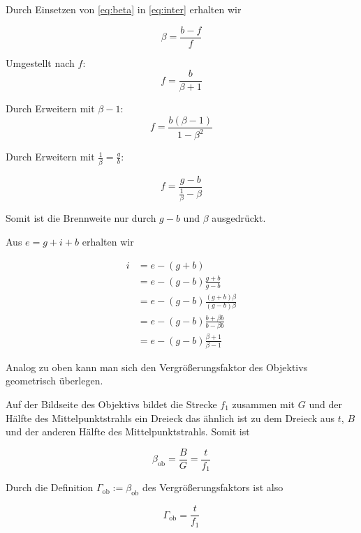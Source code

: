\documentclass[a4paper,german,12pt,smallheadings]{scrartcl}
\begin{document}
Durch Einsetzen von \ref{eq:beta} in \ref{eq:inter} erhalten wir

\begin{equation}
  \beta = \frac{b-f}{f}
\end{equation}

Umgestellt nach $f$:
\begin{equation}
  f = \frac{b}{\beta + 1}
\end{equation}

Durch Erweitern mit $\beta - 1$:
\begin{equation}
  f = \frac{b(\beta - 1)}{1-\beta^2}
\end{equation}

Durch Erweitern mit $\frac{1}{\beta} = \frac{g}{b}$:

\begin{equation}
  f = \frac{g - b}{\frac{1}{\beta} - \beta}
\end{equation}

Somit ist die Brennweite nur durch $g-b$ und $\beta$ ausgedrückt.

Aus $e = g + i + b$ erhalten wir

\begin{align*}
  i &= e - (g+b) \\
    &= e - (g-b) \frac{g+b}{g-b} \\
    &= e - (g-b) \frac{(g+b)\beta}{(g-b)\beta} \\
    &= e - (g-b) \frac{b + \beta b}{b - \beta b} \\
    &= e - (g-b) \frac{\beta + 1}{\beta - 1}
\end{align*}


Analog zu oben kann man sich den Vergrößerungsfaktor des Objektivs geometrisch
überlegen.

Auf der Bildseite des Objektivs bildet die Strecke $f_1$ zusammen mit $G$ und
der Hälfte des Mittelpunktstrahls ein Dreieck das ähnlich ist zu dem Dreieck
aus $t$, $B$ und der anderen Hälfte des Mittelpunktstrahls. Somit ist

\begin{equation}
  \beta_\text{ob} = \frac{B}{G} = \frac{t}{f_1}
\end{equation}

Durch die Definition $\Gamma_\text{ob} := \beta_\text{ob}$ des
Vergrößerungsfaktors ist also

\begin{equation}
  \Gamma_\text{ob} = \frac{t}{f_1}
\end{equation}

\end{document}
